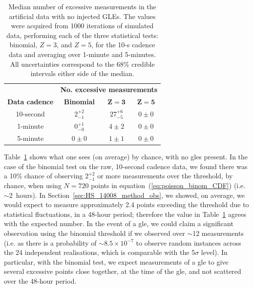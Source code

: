 \begin{table}[ht!]
	\begin{center}
		\caption{Median number of excessive measurements in the artificial data with no injected GLEs. The values were acquired from 1000 iterations of simulated data, performing each of the three statistical tests: binomial, $Z=3$, and $Z=5$, for the 10-s cadence data and averaging over 1-minute and 5-minutes. All uncertainties correspond to the 68\% credible intervals either side of the median.}
		\label{tab:HS_14008_sims_zeros}
		\begin{tabular}{c c c c}
			\hline 
			{} & \multicolumn{3}{c}{\bf No. excessive measurements} \\ 
			{\bf Data cadence} & {\bf Binomial} & {\bf $\mathbf{Z=3}$} & {\bf $\mathbf{Z=5}$}  \\ 
			\hline 
			10-second & $2^{+2}_{-1}$ & $27^{+6}_{-5}$ & $0 \pm 0$ \\ 
			1-minute & $0^{+1}_{-0}$ & $4 \pm 2$ & $0 \pm 0$ \\ 
			5-minute & $0 \pm 0$ & $1 \pm 1$ & $0 \pm 0$ \\ 
			\hline 
		\end{tabular} 
	\end{center}
\end{table}
%
%
\vspace{1em}

Table~\ref{tab:HS_14008_sims_zeros} shows what one sees (on average) by chance, with no \glspl{gle} present. In the case of the binomial test on the raw, 10-second cadence data, we found there was a 10\% chance of observing $2^{+2}_{-1}$ or more measurements over the threshold, by chance, when using $N=720$ points in equation~(\ref{eq:poisson_binom_CDF}) (i.e. $\sim$2~hours). In Section~\ref{sec:HS_14008_method_obs}, we showed, on average, we would expect to measure approximately 2.4 points exceeding the threshold due to statistical fluctuations, in a 48-hour period; therefore the value in Table~\ref{tab:HS_14008_sims_zeros} agrees with the expected number. In the event of a \gls{gle}, we could claim a significant observation using the binomial threshold if we observed over $\sim$12 measurements (i.e. as there is a probability of $\sim8.5\times10^{-7}$ to observe random instances across the 24 independent realisations, which is comparable with the 5$\sigma$ level). In particular, with the binomial test, we expect measurements of a \gls{gle} to give several excessive points close together, at the time of the \gls{gle}, and not scattered over the 48-hour period. %


